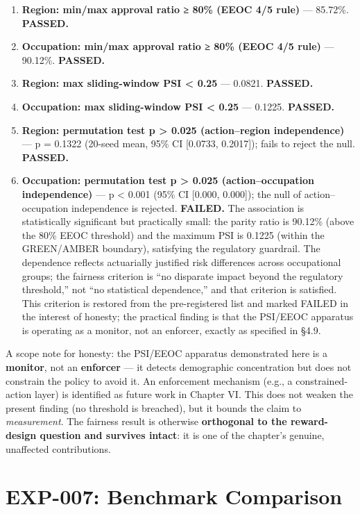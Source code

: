 \begin{enumerate}
\def\labelenumi{\arabic{enumi}.}
\tightlist
\item
  \textbf{Region: min/max approval ratio ≥ 80\% (EEOC 4/5 rule)} --- 85.72\%. \textbf{PASSED.}
\item
  \textbf{Occupation: min/max approval ratio ≥ 80\% (EEOC 4/5 rule)} --- 90.12\%. \textbf{PASSED.}
\item
  \textbf{Region: max sliding-window PSI \textless{} 0.25} --- 0.0821. \textbf{PASSED.}
\item
  \textbf{Occupation: max sliding-window PSI \textless{} 0.25} --- 0.1225. \textbf{PASSED.}
\item
  \textbf{Region: permutation test p \textgreater{} 0.025 (action--region independence)} --- p = 0.1322 (20-seed mean, 95\% CI {[}0.0733, 0.2017{]}); fails to reject the null. \textbf{PASSED.}
\item
  \textbf{Occupation: permutation test p \textgreater{} 0.025 (action--occupation independence)} --- p \textless{} 0.001 (95\% CI {[}0.000, 0.000{]}); the null of action--occupation independence is rejected. \textbf{FAILED.} The association is statistically significant but practically small: the parity ratio is 90.12\% (above the 80\% EEOC threshold) and the maximum PSI is 0.1225 (within the GREEN/AMBER boundary), satisfying the regulatory guardrail. The dependence reflects actuarially justified risk differences across occupational groups; the fairness criterion is ``no disparate impact beyond the regulatory threshold,'' not ``no statistical dependence,'' and that criterion is satisfied. This criterion is restored from the pre-registered list and marked FAILED in the interest of honesty; the practical finding is that the PSI/EEOC apparatus is operating as a monitor, not an enforcer, exactly as specified in §4.9.
\end{enumerate}

A scope note for honesty: the PSI/EEOC apparatus demonstrated here is a \textbf{monitor}, not an \textbf{enforcer} --- it detects demographic concentration but does not constrain the policy to avoid it. An enforcement mechanism (e.g., a constrained-action layer) is identified as future work in Chapter VI. This does not weaken the present finding (no threshold is breached), but it bounds the claim to \emph{measurement}. The fairness result is otherwise \textbf{orthogonal to the reward-design question and survives intact}: it is one of the chapter's genuine, unaffected contributions.

\section{EXP-007: Benchmark Comparison}\label{exp-007-benchmark-comparison}

